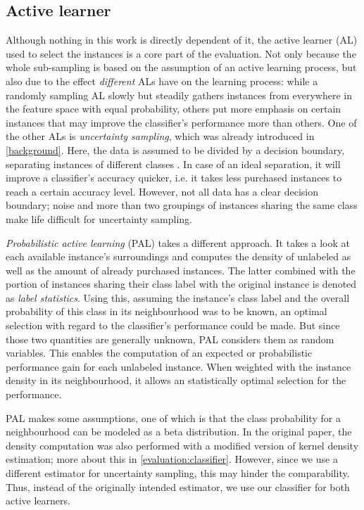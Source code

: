 \subsection{Active learner}

Although nothing in this work is directly dependent of it, the active learner (AL) used to select the instances is a core part of the evaluation. Not only because the whole sub-sampling is based on the assumption of an active learning process, but also due to the effect \textit{different} ALs have on the learning process: while a randomly sampling AL slowly but steadily gathers instances from everywhere in the feature space with equal probability, others put more emphasis on certain instances that may improve the classifier's performance more than others. One of the other ALs is \textit{uncertainty sampling}, which was already introduced in \ref{background}. Here, the data is assumed to be divided by a decision boundary, separating instances of different classes \cite{ZhuEtAl2008}. In case of an ideal separation, it will improve a classifier's accuracy quicker, i.e. it takes less purchased instances to reach a certain accuracy level. However, not all data has a clear decision boundary; noise and more than two groupings of instances sharing the same class make life difficult for uncertainty sampling.

\textit{Probabilistic active learning} (PAL) takes a different approach. It takes a look at each available instance's surroundings and computes the density of unlabeled as well as the amount of already purchased instances. The latter combined with the portion of instances sharing their class label with the original instance is denoted as \textit{label statistics}. Using this, assuming the instance's class label and the overall probability of this class in its neighbourhood was to be known, an optimal selection with regard to the classifier's performance could be made. But since those two quantities are generally unknown, PAL considers them as random variables. This enables the computation of an expected or probabilistic performance gain for each unlabeled instance. When weighted with the instance density in its neighbourhood, it allows an statistically optimal selection for the performance.

PAL makes some assumptions, one of which is that the class probability for a neighbourhood can be modeled as a beta distribution. In the original paper, the density computation was also performed with a modified version of kernel density estimation; more about this in \ref{evaluation:classifier}. However, since we use a different estimator for uncertainty sampling, this may hinder the comparability. Thus, instead of the originally intended estimator, we use our classifier for both active learners.

